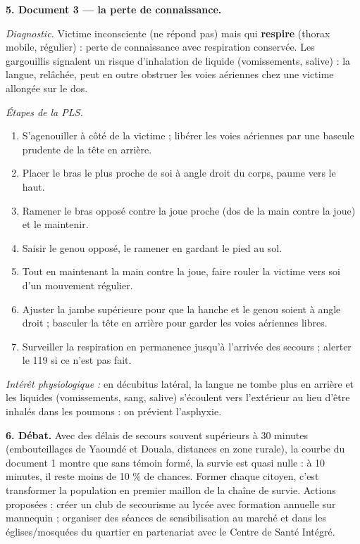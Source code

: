 \documentclass[11pt]{article}
\begin{document}
\begin{exoresolu}
\textbf{5. Document 3 — la perte de connaissance.}

\emph{Diagnostic.} Victime inconsciente (ne répond pas) mais qui \textbf{respire} (thorax mobile, régulier) : perte de connaissance avec respiration conservée. Les gargouillis signalent un risque d'inhalation de liquide (vomissements, salive) : la langue, relâchée, peut en outre obstruer les voies aériennes chez une victime allongée sur le dos.

\emph{Étapes de la PLS.}
\begin{enumerate}
\item S'agenouiller à côté de la victime ; libérer les voies aériennes par une bascule prudente de la tête en arrière.
\item Placer le bras le plus proche de soi à angle droit du corps, paume vers le haut.
\item Ramener le bras opposé contre la joue proche (dos de la main contre la joue) et le maintenir.
\item Saisir le genou opposé, le ramener en gardant le pied au sol.
\item Tout en maintenant la main contre la joue, faire rouler la victime vers soi d'un mouvement régulier.
\item Ajuster la jambe supérieure pour que la hanche et le genou soient à angle droit ; basculer la tête en arrière pour garder les voies aériennes libres.
\item Surveiller la respiration en permanence jusqu'à l'arrivée des secours ; alerter le 119 si ce n'est pas fait.
\end{enumerate}
\emph{Intérêt physiologique :} en décubitus latéral, la langue ne tombe plus en arrière et les liquides (vomissements, sang, salive) s'écoulent vers l'extérieur au lieu d'être inhalés dans les poumons : on prévient l'asphyxie.

\textbf{6. Débat.} Avec des délais de secours souvent supérieurs à 30 minutes (embouteillages de Yaoundé et Douala, distances en zone rurale), la courbe du document 1 montre que sans témoin formé, la survie est quasi nulle : à 10 minutes, il reste moins de 10 \% de chances. Former chaque citoyen, c'est transformer la population en premier maillon de la chaîne de survie. Actions proposées : créer un club de secourisme au lycée avec formation annuelle sur mannequin ; organiser des séances de sensibilisation au marché et dans les églises/mosquées du quartier en partenariat avec le Centre de Santé Intégré.
\end{exoresolu}
\end{document}
